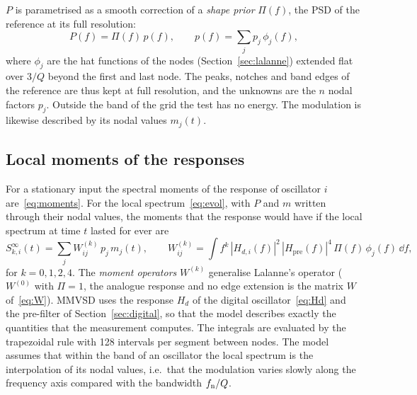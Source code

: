 $P$ is parametrised as a smooth correction of a \emph{shape prior} $\Pi(f)$, the PSD of the reference
at its full resolution:
\begin{equation}\label{eq:prior}
  P(f) = \Pi(f)\,p(f),\qquad p(f) = \sum_j p_j\,\phi_j(f),
\end{equation}
where $\phi_j$ are the hat functions of the nodes (Section~\ref{sec:lalanne}) extended flat over $3/Q$
beyond the first and last node. The peaks, notches and band edges of the reference are thus kept at
full resolution, and the unknowns are the $n$ nodal factors $p_j$. Outside the band of the grid the
test has no energy. The modulation is likewise described by its nodal values $m_j(t)$.

\subsection{Local moments of the responses}\label{sec:operators}

For a stationary input the spectral moments of the response of oscillator $i$
are~\eqref{eq:moments}. For the local spectrum~\eqref{eq:evol}, with $P$ and $m$ written through their
nodal values, the moments that the response would have if the local spectrum at time $t$ lasted for
ever are
\begin{equation}\label{eq:Sinf}
  S^{\infty}_{k,i}(t) = \sum_j W^{(k)}_{ij}\,p_j\,m_j(t),
  \qquad
  W^{(k)}_{ij} = \int f^k\,|H_{d,i}(f)|^2\,|H_{\mathrm{pre}}(f)|^4\,\Pi(f)\,\phi_j(f)\,\dd f,
\end{equation}
for $k = 0,1,2,4$. The \emph{moment operators} $W^{(k)}$ generalise Lalanne's operator ($W^{(0)}$ with
$\Pi=1$, the analogue response and no edge extension is the matrix $W$ of~\eqref{eq:W}). MMVSD uses
the response $H_d$ of the digital oscillator~\eqref{eq:Hd} and the pre-filter of
Section~\ref{sec:digital}, so that the model describes exactly the quantities that the measurement
computes. The integrals are evaluated by the trapezoidal rule with 128 intervals per segment between
nodes. The model assumes that within the band of an oscillator the local spectrum is the
interpolation of its nodal values, i.e.\ that the modulation varies slowly along the frequency axis
compared with the bandwidth $f_{\mathrm{n}}/Q$.

